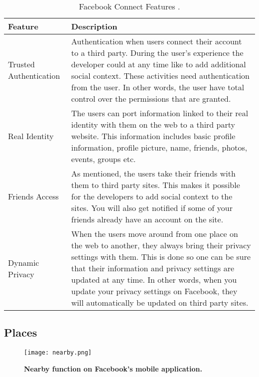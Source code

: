 \begin{center}
\begin{table}[!ht]
\caption{\label{tab:connect}Facebook Connect Features \cite{connect, connect2}.}
    \begin{tabular}{ | l | p{9cm} |}
    \hline
    \textbf{Feature} & \textbf{Description} \\ 
    \hline
    Trusted Authentication & Authentication when users connect their account to a third party. During the user's experience the developer could at any time like to add additional social context. These activities need authentication from the user. In other words, the user have total control over the permissions that are granted. \\ 
    \hline
    Real Identity &  The users can port information linked to their real identity with them on the web to a third party website. This information includes basic profile information, profile picture, name, friends, photos, events, groups etc. \\ 
    \hline
    Friends Access & As mentioned, the users take their friends with them to third party sites. This makes it possible for the developers to add social context to the sites. You will also get notified if some of your friends already have an account on the site.\\
    \hline
    Dynamic Privacy & When the users move around from one place on the web to another, they always bring their privacy settings with them. This is done so one can be sure that their information and privacy settings are updated at any time. In other words, when you update your privacy settings on Facebook, they will automatically be updated on third party sites.\\
	\hline
    \end{tabular}
   \end{table}
\end{center}


\subsection{Places}
\begin{figure}[t]
\centering
\texttt{[image: nearby.png]}
\caption[Nearby function on Facebook's mobile application]{\textbf{Nearby function on Facebook's mobile application.}} 
\label{fig:nearby}
\end{figure}

